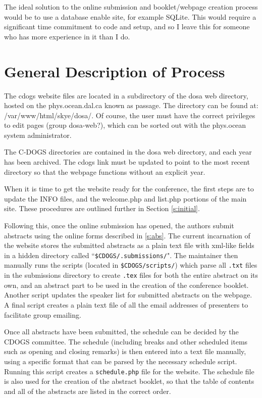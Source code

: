 \documentclass[letterpaper,12pt]{article}
\begin{document}
The ideal solution to the online submission and booklet/webpage
creation process would be to use a database enable site, for example
SQLite. This would require a significant time commitment to code and
setup, and so I leave this for someone who has more experience in it
than I do.

\section{General Description of Process}

The cdogs website files are located in a subdirectory of the dosa web
directory, hosted on the phys.ocean.dal.ca known as passage. The
directory can be found at: /var/www/html/skye/dosa/. Of course, the
user must have the correct privileges to edit pages (group dosa-web?),
which can be sorted out with the phys.ocean system administrator.

The C-DOGS directories are contained in the dosa web directory, and each
year has been archived. The cdogs link must be updated to point to the
most recent directory so that the webpage functions without an
explicit year.

When it is time to get the website ready for the conference, the first
steps are to update the INFO files, and the welcome.php and list.php
portions of the main site. These procedures are outlined further in
Section \ref{s:initial}.

Following this, once the online submission has opened, the authors
submit abstracts using the online forms described in \ref{s:abs}. The
current incarnation of the website stores the submitted abstracts as a
plain text file with xml-like fields in a hidden directory called
``\verb|$CDOGS/.submissions/|". The maintainer then manually runs the
scripts (located in \verb|$CDOGS/scripts/|) which parse all \verb|.txt| files
in the submissions directory to create \verb|.tex| files for both the
entire abstract on its own, and an abstract part to be used in the
creation of the conference booklet. Another script updates the
speaker list for submitted abstracts on the webpage. A final script
creates a plain text file of all the email addresses of presenters to
facilitate group emailing.

Once all abstracts have been submitted, the schedule can be decided by
the CDOGS committee. The schedule (including breaks and other
scheduled items such as opening and closing remarks) is then entered
into a text file manually, using a specific format that can be parsed
by the necessary schedule script. Running this script creates a
\verb|schedule.php| file for the website. The schedule file is also
used for the creation of the abstract booklet, so that the table of
contents and all of the abstracts are listed in the correct order. 
\end{document}
